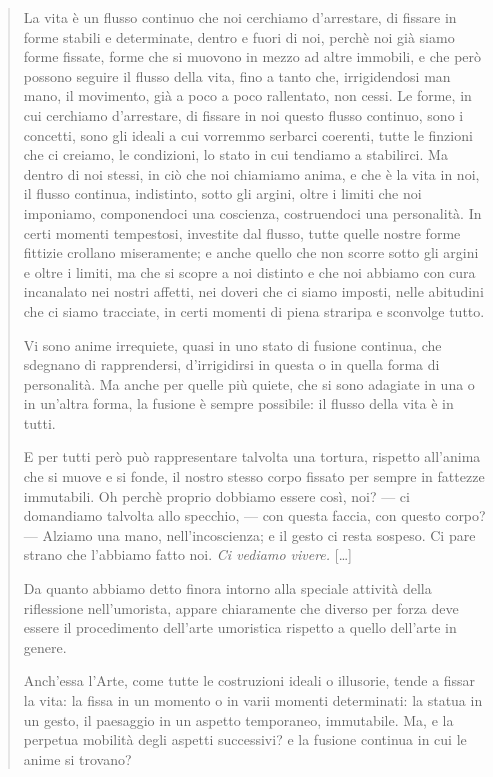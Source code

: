 \documentclass[a4paper, twoside, titlepage]{book}
\begin{document}
\begin{quotation}
La vita è un flusso continuo che noi cerchiamo d’arrestare, di fissare in forme stabili e determinate, dentro e fuori di noi, perchè noi già siamo forme fissate, forme che si muovono in mezzo ad altre immobili, e che però possono seguire il flusso della vita, fino a tanto che, irrigidendosi man mano, il movimento, già a poco a poco rallentato, non cessi. Le forme, in cui cerchiamo d’arrestare, di fissare in noi questo flusso continuo, sono i concetti, sono gli ideali a cui vorremmo serbarci coerenti, tutte le finzioni che ci creiamo, le condizioni, lo stato in cui tendiamo a stabilirci. Ma dentro di noi stessi, in ciò che noi chiamiamo anima, e che è la vita in noi, il flusso continua, indistinto, sotto gli argini, oltre i limiti che noi imponiamo, componendoci una coscienza, costruendoci una personalità. In certi momenti tempestosi, investite dal flusso, tutte quelle nostre forme fittizie crollano miseramente; e anche quello che non scorre sotto gli argini e oltre i limiti, ma che si scopre a noi distinto e che noi abbiamo con cura incanalato nei nostri affetti, nei doveri che ci siamo imposti, nelle abitudini che ci siamo tracciate, in certi momenti di piena straripa e sconvolge tutto.

Vi sono anime irrequiete, quasi in uno stato di fusione continua, che sdegnano di rapprendersi, d’irrigidirsi in questa o in quella forma di personalità. Ma anche per quelle più quiete, che si sono adagiate in una o in un’altra forma, la fusione è sempre possibile: il flusso della vita è in tutti.

E per tutti però può rappresentare talvolta una tortura, rispetto all’anima che si muove e si fonde, il nostro stesso corpo fissato per sempre in fattezze immutabili. Oh perchè proprio dobbiamo essere così, noi? — ci domandiamo talvolta allo specchio, — con questa faccia, con questo corpo? — Alziamo una mano, nell’incoscienza; e il gesto ci resta sospeso. Ci pare strano che l’abbiamo fatto noi. \textit{Ci vediamo vivere.} [\dots]

Da quanto abbiamo detto finora intorno alla speciale attività della riflessione nell’umorista, appare chiaramente che diverso per forza deve essere il procedimento dell’arte umoristica rispetto a quello dell’arte in genere.

Anch’essa l’Arte, come tutte le costruzioni ideali o illusorie, tende a fissar la vita: la fissa in un momento o in varii momenti determinati: la statua in un gesto, il paesaggio in un aspetto temporaneo, immutabile. Ma, e la perpetua mobilità degli aspetti successivi? e la fusione continua in cui le anime si trovano?
\end{quotation}
\end{document}
